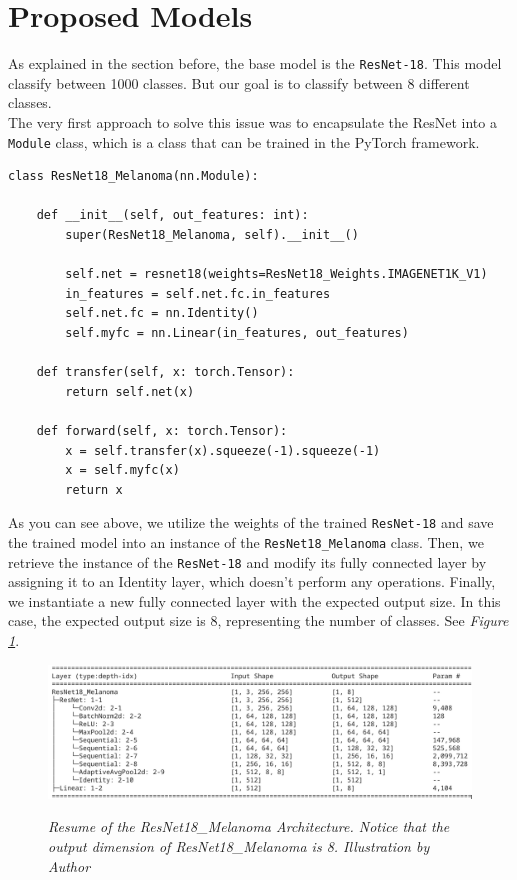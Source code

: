 \section{Proposed Models}

As explained in the section before, the base model is the {\tt ResNet-18}. This model classify
between 1000 classes. But our goal is to classify between 8 different classes. \\

The very first approach to solve this issue was to encapsulate the ResNet into a {\tt Module} class, which is a class that can be trained in the PyTorch framework.

\begin{Verbatim}[fontsize=\small]
class ResNet18_Melanoma(nn.Module):

    def __init__(self, out_features: int):
        super(ResNet18_Melanoma, self).__init__()

        self.net = resnet18(weights=ResNet18_Weights.IMAGENET1K_V1)
        in_features = self.net.fc.in_features
        self.net.fc = nn.Identity()
        self.myfc = nn.Linear(in_features, out_features)

    def transfer(self, x: torch.Tensor):
        return self.net(x)

    def forward(self, x: torch.Tensor):
        x = self.transfer(x).squeeze(-1).squeeze(-1)
        x = self.myfc(x)
        return x
\end{Verbatim}

As you can see above, we utilize the weights of the trained {\tt ResNet-18} and save the trained model into an instance of the {\tt ResNet18\_Melanoma} class. Then, we retrieve the instance of the {\tt ResNet-18} and modify its fully connected layer by assigning it to an Identity layer, which doesn't perform any operations. Finally, we instantiate a new fully connected layer with the expected output size. In this case, the expected output size is 8, representing the number of classes. See \textit{Figure \ref{fig:resnet-18-melanoma-arch}}.

\begin{figure}[H]
\centering
\includegraphics[width=\textwidth]{imatges/methodological_contribution/ResNet18_Melanoma.png}
\caption[Resume of the ResNet18\_Melanoma Architecture]{\textit{Resume of the ResNet18\_Melanoma Architecture. Notice that the output dimension of ResNet18\_Melanoma is 8. Illustration by Author}}
{\label{fig:resnet-18-melanoma-arch}}
\end{figure}


